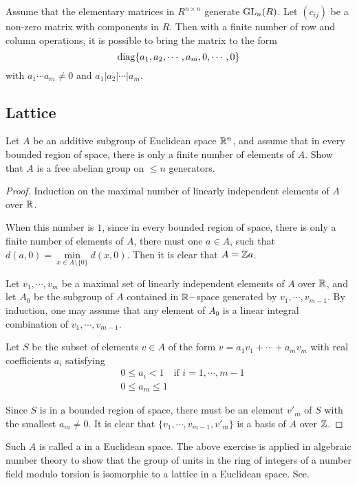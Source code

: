   \begin{thm}
    Assume that the elementary matrices in $R^{n\times n}$ generate $\operatorname{GL}_n(R)$. Let $(c_{ij})$ be a non-zero matrix with components in $R$. Then with a finite number of row and column operations, it is possible to bring the matrix to the form
    \begin{equation*}
      \operatorname{diag}\{a_1,a_2,\cdots,a_m,0,\cdots,0\}
    \end{equation*}
    with $a_1\cdots a_m\neq0$ and $a_1|a_2|\cdots|a_m$.
  \end{thm}



\subsection{Lattice}
  \begin{ex}
    Let $A$ be an additive subgroup of Euclidean space ${\mathbb R}^n$, and assume that in every bounded region of space, there is only a finite number of elements of $A$. Show that $A$ is a free abelian group on $\leqslant n$ generators.
  \end{ex}
  \begin{proof}
    Induction on the maximal number of linearly independent elements of $A$ over ${\mathbb R}$.

    When this number is $1$, since in every bounded region of space, there is only a finite number of elements of $A$, there must one $a\in A$, such that $d(a,0)=\min\limits_{x\in A\setminus\{0\}}d(x,0)$. Then it is clear that $A={\mathbb Z} a$.

    Let $v_1,\cdots,v_m$ be a maximal set of linearly independent elements of $A$ over ${\mathbb R}$, and let $A_0$ be the subgroup of $A$ contained in ${\mathbb R}-$space generated by $v_1,\cdots,v_{m-1}$. By induction, one may assume that any element of $A_0$ is a linear integral combination of $v_1,\cdots,v_{m-1}$.

    Let $S$ be the subset of elements $v\in A$ of the form $v=a_1v_1+\cdots+a_mv_m$ with real coefficients $a_i$ satisfying
    \begin{align*}
      &0\leqslant a_i<1  \quad\text{if } i=1,\cdots,m-1 \\
      &0\leqslant a_m\leqslant1
    \end{align*}

    Since $S$ is in a bounded region of space, there must be an element $v'_m$ of $S$ with the smallest $a_m\neq0$. It is clear that $\{v_1,\cdots,v_{m-1},v'_m\}$ is a basis of $A$ over ${\mathbb Z}$.
  \end{proof}
  \begin{rem}
    Such $A$ is called a  in a Euclidean space. The above exercise is applied in algebraic number theory to show that the group of units in the ring of integers of a number field modulo torsion is isomorphic to a lattice in a Euclidean space. See.
  \end{rem}

